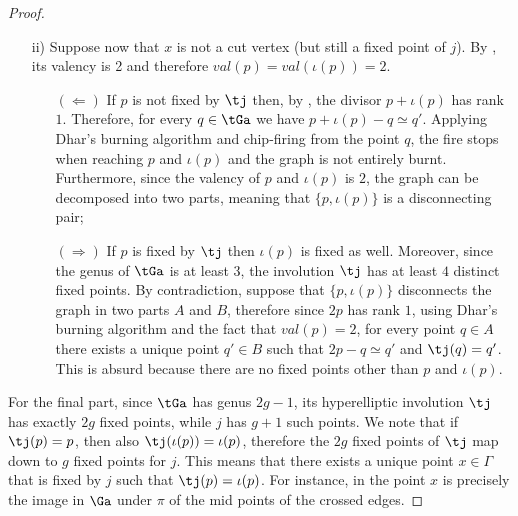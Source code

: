 {\begin{proof}
\begin{itemize}
\begin{itemize}
                \item [$(\Rightarrow)$] If $p$ is a fixed point of $\tj$ then, from  applied to both $p$ and $x$, we conclude that the valency of $p$ is at least $4$. Therefore, by applying  to $p$ and $\iota p$, they are both  cut vertices.  
            \end{itemize}
            \item[ii)] Suppose now that $x$ is not a cut vertex (but still a fixed point of $j$). By  , its valency is 2 and therefore $val(p)=val(\iota(p))=2$.
            \begin{itemize}
                \item [$(\Leftarrow)$] If $p$ is not fixed by $\tj$ then, by , the divisor $p+\iota(p)$ has rank $1$. 
                Therefore, for every $q\in \tGa$ we have $p+\iota(p)-q\simeq q'$. Applying Dhar's burning algorithm and chip-firing from the point $q$, the fire stops when reaching $p$ and $\iota(p)$ and the graph is not entirely burnt. Furthermore, since the valency of $p$ and  $\iota(p)$ is $2$, the graph can be decomposed into two parts,
meaning that $\{p,\iota(p)\}$ is a disconnecting pair;
                \item [$(\Rightarrow)$] If $p$ is fixed by $\tj$ then  $\iota(p)$ is fixed as well. Moreover, since the genus of $\tGa$ is at least $3$, the involution $\tj$ has at least $4$ distinct fixed points. By contradiction, suppose that $\{p,\iota(p)\}$ disconnects the graph in two parts $A$ and $B$, therefore since $2p$ has rank $1$, using Dhar's burning algorithm and the fact that $val(p)=2$,
                for every point $q\in A$ there exists a unique point $q'\in B$ such that $2p-q\simeq q'$ and $\tj(q)=q'$. This is absurd because there are no fixed points other than $p$ and $\iota(p)$.
            \end{itemize}
        \end{itemize}

                For the final part, 
since $\tGa$ has genus $2g-1$, its hyperelliptic involution $\tj$ has exactly $2g$ fixed points, while $j$ has $g+1$ such points. We note that if $\tj(p)=p$, then also  $\tj(\iota(p))=\iota(p)$, therefore  the $2g$ fixed points of $\tj$ map down to $g$ fixed points for $j$. This means that there exists a unique  point $x\in \Gamma$ that is fixed by $j$ such that $\tj(p)=\iota(p)$. For instance, in  the point $x$ is precisely the image in $\Ga$ under $\pi$ of the mid points of the crossed edges.
    \end{proof}

}
